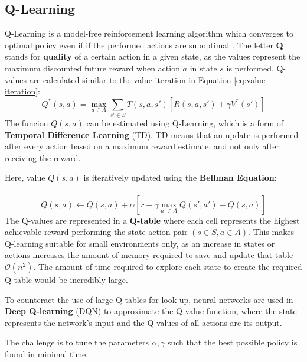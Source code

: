 \documentclass[a4paper]{article}
\begin{document}
	\subsection{Q-Learning}\label{sec:qlearn}
	Q-Learning is a model-free reinforcement learning algorithm which converges to optimal policy even if if the performed actions are suboptimal \citep{Lecture}. The letter \textbf{Q} stands for \textbf{quality} of a certain action in a given state, as the values represent the maximum discounted future reward when action $a$ in state $s$ is performed. Q-values are calculated similar to the value iteration in Equation \ref{eq:value-iteration}:
	\begin{equation}\label{eq:qlearn}
	Q^*(s,a) = \max_{a \in A} \sum_{s' \in S}^{} T(s,a,s')[R(s,a,s')+\gamma V^*(s')]
	\end{equation}
	The funcion $Q(s,a)$ can be estimated using Q-Learning, which is a form of \textbf{Temporal Difference Learning} (TD). TD means that an update is performed after every action based on a maximum reward estimate, and not only after receiving the reward.
	\par  Here, value $Q(s,a)$ is iteratively updated using the \textbf{Bellman Equation}: \\\\
	\begin{equation}\label{eq:qupdate}
	Q(s,a) \leftarrow Q(s,a) + \alpha [r + \gamma \max_{a' \in A}Q(s',a')-Q(s,a)]
	\end{equation}
	The Q-values are represented in a \textbf{Q-table} where each cell represents the highest achievable reward performing the state-action pair $(s\in S, a\in A)$. This makes Q-learning suitable for small environments only, as an increase in states or actions increases the amount of memory required to save and update that table $\mathcal{O}(n^2)$. The amount of time required to explore each state to create the required Q-table would be incredibly large.
	\par To counteract the use of large Q-tables for look-up, neural networks are used in \textbf{Deep Q-learning} (DQN) to approximate the Q-value function, where the state represents the network's input and the Q-values of all actions are its output.
	\par The challenge is to tune the parameters $\alpha , \gamma$ such that the best possible policy is found in minimal time.
\end{document}
